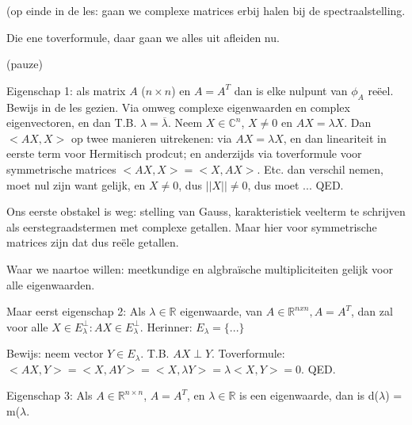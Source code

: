 \documentclass{article}
\begin{document}
(op einde in de les: gaan we complexe matrices erbij halen bij de spectraalstelling. 

Die ene toverformule, daar gaan we alles uit afleiden nu. 

(pauze) 

Eigenschap 1: als matrix $A$ ($n \times n$) en $A=A^T$ dan is elke nulpunt van $\phi_A$ re\"eel. 
Bewijs in de les gezien. Via omweg complexe eigenwaarden en complex eigenvectoren, en dan T.B. $\lambda = \overline{\lambda}$.  
Neem $X \in \mathbb{C}^n$, $X \neq 0$ en $AX=\lambda X$. Dan $<AX,X>$ op twee manieren uitrekenen: via $AX=\lambda X$, en dan lineariteit in eerste term voor Hermitisch prodcut;  en anderzijds via toverformule voor symmetrische matrices $<AX,X> = <X,AX>$. Etc. dan verschil nemen, moet nul zijn want gelijk, en $X \neq 0$, dus $||X|| \neq 0$, dus moet ... QED. 

Ons eerste obstakel is weg: stelling van Gauss, karakteristiek veelterm te schrijven als eerstegraadstermen met complexe getallen. Maar hier voor symmetrische matrices zijn dat dus re\"ele getallen. 

Waar we naartoe willen: meetkundige en algbra\"ische multipliciteiten gelijk voor alle eigenwaarden. 

Maar eerst eigenschap 2: 
Als $\lambda \in \mathbb{R}$ eigenwaarde, van $A \in \mathbb{R}^{nxn}, A=A^T$, dan zal voor alle $X \in E_\lambda^{\perp}: AX \in  E_\lambda^{\perp}$. 
Herinner: $E_\lambda = \{ ...  \} $

Bewijs: neem vector $Y \in E_\lambda$. T.B. $AX \perp Y$. 
Toverformule: $<AX,Y> = <X,AY> = <X,\lambda Y> = \lambda <X,Y> = 0$. QED. 


Eigenschap 3: Als $A \in \mathbb{R}^{n \times n}$, $A=A^T$, en $\lambda \in \mathbb{R}$ is een eigenwaarde, dan is d($\lambda$) = m($\lambda$. 
\end{document}
